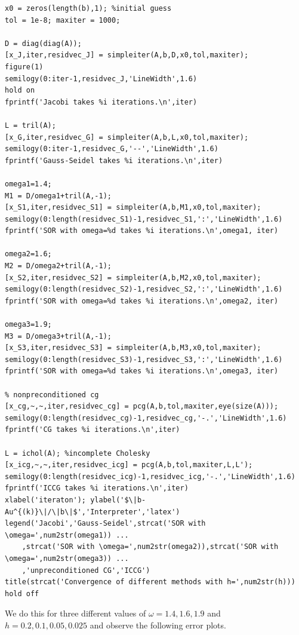 \documentclass{article}
\begin{document}
\begin{verbatim}
x0 = zeros(length(b),1); %initial guess
tol = 1e-8; maxiter = 1000;

D = diag(diag(A));
[x_J,iter,residvec_J] = simpleiter(A,b,D,x0,tol,maxiter);
figure(1)
semilogy(0:iter-1,residvec_J,'LineWidth',1.6)
hold on
fprintf('Jacobi takes %i iterations.\n',iter)

L = tril(A);
[x_G,iter,residvec_G] = simpleiter(A,b,L,x0,tol,maxiter);
semilogy(0:iter-1,residvec_G,'--','LineWidth',1.6)
fprintf('Gauss-Seidel takes %i iterations.\n',iter)

omega1=1.4;
M1 = D/omega1+tril(A,-1);
[x_S1,iter,residvec_S1] = simpleiter(A,b,M1,x0,tol,maxiter);
semilogy(0:length(residvec_S1)-1,residvec_S1,':','LineWidth',1.6)
fprintf('SOR with omega=%d takes %i iterations.\n',omega1, iter)

omega2=1.6;
M2 = D/omega2+tril(A,-1);
[x_S2,iter,residvec_S2] = simpleiter(A,b,M2,x0,tol,maxiter);
semilogy(0:length(residvec_S2)-1,residvec_S2,':','LineWidth',1.6)
fprintf('SOR with omega=%d takes %i iterations.\n',omega2, iter)

omega3=1.9;
M3 = D/omega3+tril(A,-1);
[x_S3,iter,residvec_S3] = simpleiter(A,b,M3,x0,tol,maxiter);
semilogy(0:length(residvec_S3)-1,residvec_S3,':','LineWidth',1.6)
fprintf('SOR with omega=%d takes %i iterations.\n',omega3, iter)

% nonpreconditioned cg
[x_cg,~,~,iter,residvec_cg] = pcg(A,b,tol,maxiter,eye(size(A)));
semilogy(0:length(residvec_cg)-1,residvec_cg,'-.','LineWidth',1.6)
fprintf('CG takes %i iterations.\n',iter)

L = ichol(A); %incomplete Cholesky
[x_icg,~,~,iter,residvec_icg] = pcg(A,b,tol,maxiter,L,L');
semilogy(0:length(residvec_icg)-1,residvec_icg,'-.','LineWidth',1.6)
fprintf('ICCG takes %i iterations.\n',iter)
xlabel('iteraton'); ylabel('$\|b-Au^{(k)}\|/\|b\|$','Interpreter','latex')
legend('Jacobi','Gauss-Seidel',strcat('SOR with \omega=',num2str(omega1)) ...
    ,strcat('SOR with \omega=',num2str(omega2)),strcat('SOR with \omega=',num2str(omega3)) ...
    ,'unpreconditioned CG','ICCG')
title(strcat('Convergence of different methods with h=',num2str(h)))
hold off
\end{verbatim}
We do this for three different values of $\omega=1.4, 1.6,1.9$ and $h=0.2,0.1,0.05,0.025$ and observe the following error plots.
\end{document}
